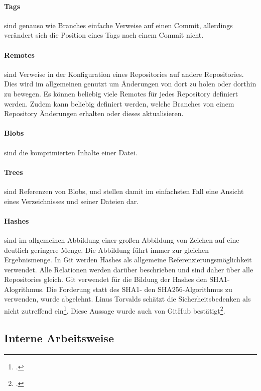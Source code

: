 \paragraph{Tags} sind genauso wie Branches einfache Verweise auf einen Commit, allerdings verändert sich die Position 
eines Tags nach einem Commit nicht.

\paragraph{Remotes} sind Verweise in der Konfiguration eines Repositories auf andere Repositories. Dies wird im 
allgemeinen genutzt um Änderungen von dort zu holen oder dorthin zu bewegen. Es können beliebig viele Remotes für jedes 
Repository definiert werden. Zudem kann beliebig definiert werden, welche Branches von einem Repository Änderungen 
erhalten oder dieses aktualisieren.

\paragraph{Blobs} sind die komprimierten Inhalte einer Datei.

\paragraph{Trees} sind Referenzen von Blobs, und stellen damit im einfachsten Fall eine Ansicht eines Verzeichnisses und 
seiner Dateien dar.

\paragraph{Hashes} sind im allgemeinen Abbildung einer großen Abbildung von Zeichen auf eine deutlich geringere Menge. 
Die Abbildung führt immer zur gleichen Ergebnismenge. In Git werden Hashes als allgemeine Referenzierungsmöglichkeit 
verwendet. Alle Relationen werden darüber beschrieben und sind daher über alle Repositories gleich. Git verwendet für die 
Bildung der Hashes den SHA1-Alogrithmus. Die Forderung statt des SHA1- den SHA256-Algorithmus zu verwenden, wurde 
abgelehnt. Linus Torvalds schätzt die Sicherheitsbedenken als nicht zutreffend ein\footcite{git-sha-torvalds}. Diese 
Aussage wurde auch von GitHub bestätigt\footcite{git-sha-github}.

\subsection{Interne Arbeitsweise}

